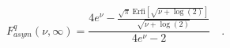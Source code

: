 \begin{equation}
F^q_{asym}(\nu,\infty)= \frac{4
e^\nu-\frac{\sqrt{\pi}~\mbox{Erfi}[\sqrt{\nu+\log(2)}]}{\sqrt{\nu+\log(2)}}}{4
e^\nu-2}\quad.
\end{equation}

